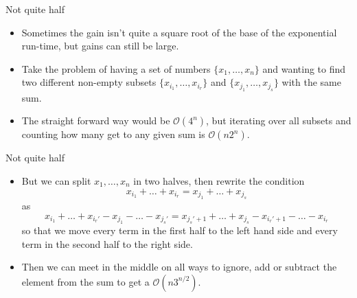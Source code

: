 \documentclass{beamer}
\begin{document}
\begin{frame}{Not quite half}
    \begin{itemize}
        \item Sometimes the gain isn't quite a square root of the base of the exponential run-time, but gains can still be large.
        \item Take the problem of having a set of numbers $\{x_1, \dots, x_n\}$ and wanting to find two different non-empty subsets $\{x_{i_1}, \dots, x_{i_r}\}$ and $\{x_{j_1}, \dots, x_{j_s}\}$ with the same sum.
        \item The straight forward way would be $\mathcal{O}(4^n)$, but iterating over all subsets and counting how many get to any given sum is $\mathcal{O}(n2^n)$.
    \end{itemize}
\end{frame}

\begin{frame}{Not quite half}
    \begin{itemize}
        \item But we can split $x_1, \dots, x_n$ in two halves, then rewrite the condition
        \[ x_{i_1} + \dots+ x_{i_r} = x_{j_1} + \dots + x_{j_s}\]
        as
        \[ x_{i_1} + \dots + x_{i_r'} - x_{j_1} - \dots - x_{j_s'} = x_{j_s'+1} + \dots + x_{j_s} - x_{i_r' + 1} - \dots - x_{i_r}\]
        so that we move every term in the first half to the left hand side and every term in the second half to the right side.
        \item Then we can meet in the middle on all ways to ignore, add or subtract the element from the sum to get a $\mathcal{O}(n3^{n/2})$.
    \end{itemize}
\end{frame}
\end{document}
